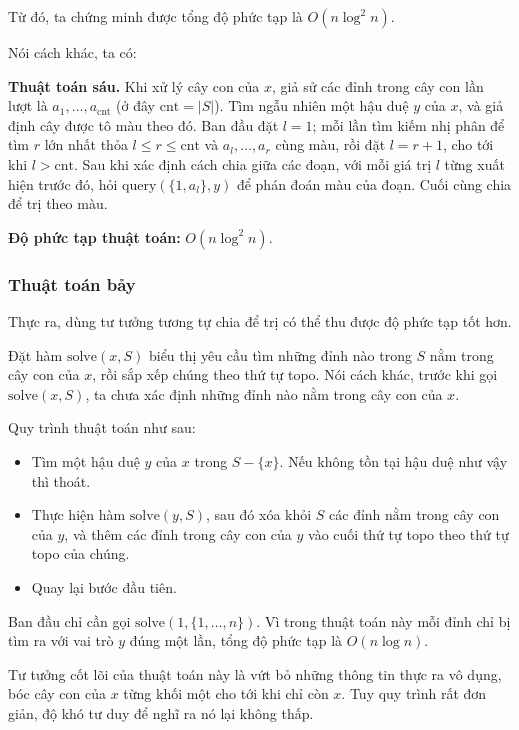 \documentclass[11pt]{article}
\begin{document}
Từ đó, ta chứng minh được tổng độ phức tạp là \(O(n\log^2 n)\).

Nói cách khác, ta có:

\textbf{Thuật toán sáu.} Khi xử lý cây con của \(x\), giả sử các đỉnh trong cây
con lần lượt là \(a_1,\ldots,a_{\mathrm{cnt}}\) (ở đây
\(\mathrm{cnt}=|S|\)). Tìm ngẫu nhiên một hậu duệ \(y\) của \(x\), và giả định
cây được tô màu theo đó. Ban đầu đặt \(l=1\); mỗi lần tìm kiếm nhị phân để tìm
\(r\) lớn nhất thỏa \(l\le r\le \mathrm{cnt}\) và \(a_l,\ldots,a_r\) cùng màu,
rồi đặt \(l=r+1\), cho tới khi \(l>\mathrm{cnt}\). Sau khi xác định cách chia
giữa các đoạn, với mỗi giá trị \(l\) từng xuất hiện trước đó, hỏi
\(\mathrm{query}(\{1,a_l\},y)\) để phán đoán màu của đoạn. Cuối cùng chia để trị
theo màu.

\textbf{Độ phức tạp thuật toán:} \(O(n\log^2 n)\).

\subsubsection{Thuật toán bảy}

Thực ra, dùng tư tưởng tương tự chia để trị có thể thu được độ phức tạp tốt hơn.

Đặt hàm \(\mathrm{solve}(x,S)\) biểu thị yêu cầu tìm những đỉnh nào trong \(S\)
nằm trong cây con của \(x\), rồi sắp xếp chúng theo thứ tự topo. Nói cách khác,
trước khi gọi \(\mathrm{solve}(x,S)\), ta chưa xác định những đỉnh nào nằm trong
cây con của \(x\).

Quy trình thuật toán như sau:

\begin{itemize}
  \item Tìm một hậu duệ \(y\) của \(x\) trong \(S-\{x\}\). Nếu không tồn tại hậu
  duệ như vậy thì thoát.
  \item Thực hiện hàm \(\mathrm{solve}(y,S)\), sau đó xóa khỏi \(S\) các đỉnh
  nằm trong cây con của \(y\), và thêm các đỉnh trong cây con của \(y\) vào cuối
  thứ tự topo theo thứ tự topo của chúng.
  \item Quay lại bước đầu tiên.
\end{itemize}

Ban đầu chỉ cần gọi \(\mathrm{solve}(1,\{1,\ldots,n\})\). Vì trong thuật toán
này mỗi đỉnh chỉ bị tìm ra với vai trò \(y\) đúng một lần, tổng độ phức tạp là
\(O(n\log n)\).

Tư tưởng cốt lõi của thuật toán này là vứt bỏ những thông tin thực ra vô dụng,
bóc cây con của \(x\) từng khối một cho tới khi chỉ còn \(x\). Tuy quy trình rất
đơn giản, độ khó tư duy để nghĩ ra nó lại không thấp.
\end{document}
